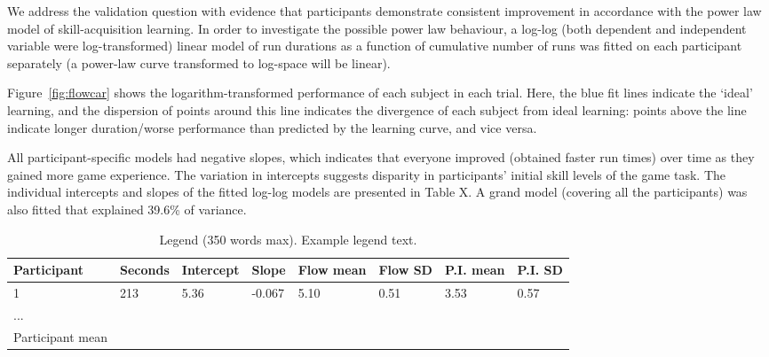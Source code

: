 \documentclass[fleqn,10pt]{wlscirep}
\begin{document}
We address the validation question with evidence that participants demonstrate consistent improvement in accordance with the power law model of skill-acquisition learning. In order to investigate the possible power law behaviour, a log-log (both dependent and independent variable were log-transformed) linear model of run durations as a function of cumulative number of runs was fitted on each participant separately (a power-law curve transformed to log-space will be linear).

Figure~\ref{fig:flowcar} shows the logarithm-transformed performance of each subject in each trial. Here, the blue fit lines indicate the `ideal' learning, and the dispersion of points around this line indicates the divergence of each subject from ideal learning: points above the line indicate longer duration/worse performance than predicted by the learning curve, and vice versa.

All participant-specific models had negative slopes, which indicates that everyone improved (obtained faster run times) over time as they gained more game experience. The variation in intercepts suggests disparity in participants’ initial skill levels of the game task. The individual intercepts and slopes of the fitted log-log models are presented in Table X.
A grand model (covering all the participants) was also fitted that explained 39.6\% of variance.

\begin{table}[ht]
\centering
\begin{tabular}{llllllll}
\hline
Participant & Seconds & Intercept & Slope & Flow mean & Flow SD & P.I. mean & P.I. SD \\
\hline
1 & 213 & 5.36 & -0.067 & 5.10 & 0.51 & 3.53 & 0.57 \\
...&&&&&&& \\
Participant mean &&&&&&& \\
\hline
\end{tabular}
\caption{\label{tab:LCxFlow}Legend (350 words max). Example legend text.}
\end{table}
\end{document}
